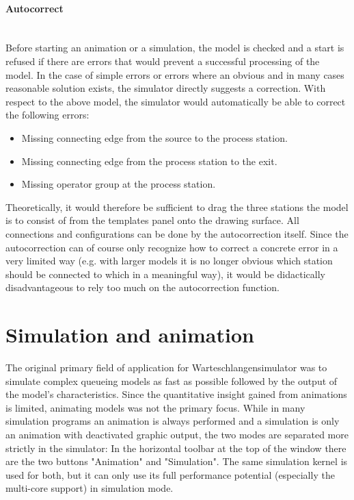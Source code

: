 \documentclass{svmono}
\begin{document}
\paragraph{Autocorrect}~\\
Before starting an animation or a simulation, the model is checked and a start is refused if there are errors that would prevent a successful processing of the model. In the case of simple errors or errors where an obvious and in many cases reasonable solution exists, the simulator directly suggests a correction. With respect to the above model, the simulator would automatically be able to correct the following errors:
\begin{itemize}
\item
Missing connecting edge from the source to the process station.
\item
Missing connecting edge from the process station to the exit.
\item
Missing operator group at the process station.
\end{itemize}
Theoretically, it would therefore be sufficient to drag the three stations the model is to consist of from the templates panel onto the drawing surface. All connections and configurations can be done by the autocorrection itself. Since the autocorrection can of course only recognize how to correct a concrete error in a very limited way (e.g. with larger models it is no longer obvious which station should be connected to which in a meaningful way), it would be didactically disadvantageous to rely too much on the autocorrection function.



\section{Simulation and animation}

The original primary field of application for Warteschlangensimulator was to simulate complex queueing models as fast as possible followed by the output of the model's characteristics. Since the quantitative insight gained from animations is limited, animating models was not the primary focus. While in many simulation programs an animation is always performed and a simulation is only an animation with deactivated graphic output, the two modes are separated more strictly in the simulator: In the horizontal toolbar at the top of the window there are the two buttons "Animation" and "Simulation". The same simulation kernel is used for both, but it can only use its full performance potential (especially the multi-core support) in simulation mode.
\end{document}

